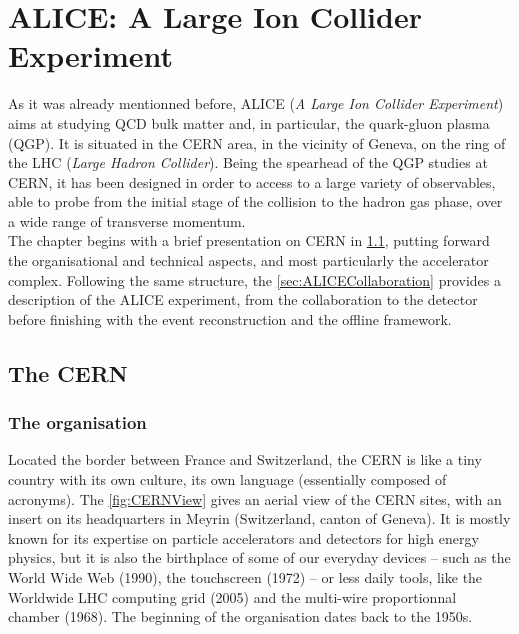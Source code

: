 \newpage
\chapter{ALICE: A Large Ion Collider Experiment}
\label{chap:ALICE}

As it was already mentionned before, ALICE (\textit{A Large Ion Collider Experiment})  aims at studying QCD bulk matter and, in particular, the quark-gluon plasma (QGP). It is situated in the CERN area, in the vicinity of Geneva, on the ring of the LHC (\textit{Large Hadron Collider}). Being the spearhead of the QGP studies at CERN, it has been designed in order to access to a large variety of observables, able to probe from the initial stage of the collision to the hadron gas phase, over a wide range of transverse momentum.\\

The chapter begins with a brief presentation on CERN in \Sec\ref{sec:CERN}, putting forward the organisational and technical aspects, and most particularly the accelerator complex. Following the same structure, the \Sec\ref{sec:ALICECollaboration} provides a description of the ALICE experiment, from the collaboration to the detector before finishing with the event reconstruction and the offline framework.


\section{The CERN}
\label{sec:CERN}

\subsection{The organisation}


Located the border between France and Switzerland, the CERN is like a tiny country with its own culture, its own language (essentially composed of acronyms). The \fig\ref{fig:CERNView} gives an aerial view of the CERN sites, with an insert on its headquarters in Meyrin (Switzerland, canton of Geneva). It is mostly known for its expertise on particle accelerators and detectors for high energy physics, but it is also the birthplace of some of our everyday devices -- such as the World Wide Web (1990), the touchscreen (1972) -- or less daily tools, like the Worldwide LHC computing grid (2005) and the multi-wire proportionnal chamber (1968). The beginning of the organisation dates back to the 1950s.\\

